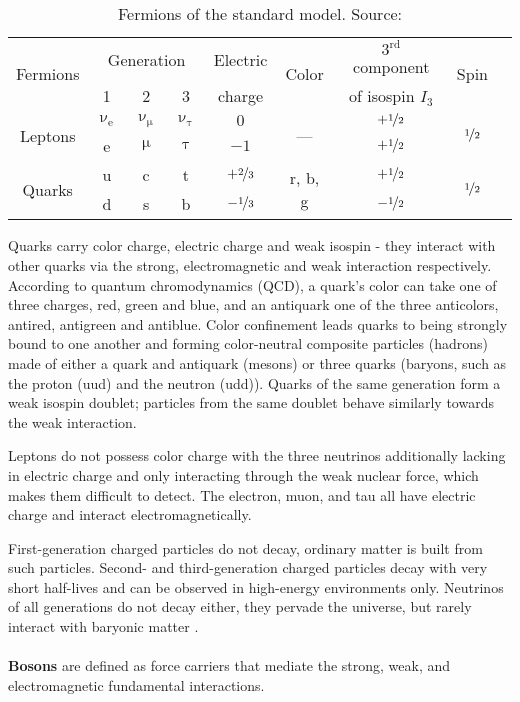 \begin{table}[h]
\caption[Fermions of the SM]{Fermions of the standard model. Source: \cite{povh,schenkel}}
\label{tab:ch_1_sm_fermions}
\begin{tabular}{ccccccccc}
\toprule
\multirow{2}{*}{Fermions} & \multicolumn{3}{c}{Generation} & {Electric} & \multirow{2}{*}{Color} & {$3^{\mathrm{rd}}$ component} & \multirow{2}{*}{Spin}\\
& 1 & 2 & 3 & {charge} & & {of isospin $I_3$} & \\
\midrule
\multirow{2}{*}{Leptons} & $\upnu_\textrm{e}$ & $\upnu_\upmu$ & $\upnu_\uptau$ & {$0$} & \multirow{2}{*}{---} & {$+\nicefrac{1}{2}$} & \multirow{2}{*}{$\nicefrac{1}{2}$}\\
& e & $\upmu$ & $\uptau$ & {$-1$} & & {$+\nicefrac{1}{2}$} &\\
\midrule
\multirow{2}{*}{Quarks} & u & c & t & $+\nicefrac{2}{3}$ & \multirow{2}{*}{r, b, g} & {$+\nicefrac{1}{2}$} & \multirow{2}{*}{$\nicefrac{1}{2}$}\\
& d & s & b & $-\nicefrac{1}{3}$ & & {$-\nicefrac{1}{2}$} & \\
\bottomrule
\end{tabular}
\end{table}

Quarks carry color charge, electric charge and weak isospin - they interact with other quarks via the strong, electromagnetic and weak interaction respectively. According to quantum chromodynamics (QCD), a quark's color can take one of three charges, red, green and blue, and an antiquark one of the three anticolors,  antired, antigreen and antiblue. Color confinement leads quarks to being strongly bound to one another and forming color-neutral composite particles (hadrons) made of either a quark and antiquark (mesons) or three quarks (baryons, such as the proton (uud) and the neutron (udd)). Quarks of the same generation form a weak isospin doublet; particles from the same doublet behave similarly towards the weak interaction.

Leptons do not possess color charge with the three neutrinos additionally lacking in electric charge and only interacting through the weak nuclear force, which makes them difficult to detect. The electron, muon, and tau all have electric charge and interact electromagnetically.

First-generation charged particles do not decay, ordinary matter is built from such particles. Second- and third-generation charged particles decay with very short half-lives and can be observed in high-energy environments only. Neutrinos of all generations do not decay either, they pervade the universe, but rarely interact with baryonic matter \cite{wiki:standardmodel}.\\ \\
\textbf{Bosons} are defined as force carriers that mediate the strong, weak, and electromagnetic fundamental interactions.

